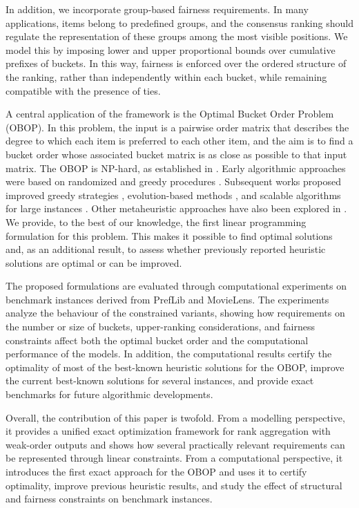 \documentclass[pdflatex,basic,Numbered]{jnl}%
\theoremstyle{plain}
\theoremstyle{remark}
\theoremstyle{thmstyleone}%
\theoremstyle{thmstylethree}%
\begin{document}
In addition, we incorporate group-based fairness requirements. In many applications, items belong to predefined groups, and the consensus ranking should regulate the representation of these groups among the most visible positions. We model this by imposing lower and upper proportional bounds over cumulative prefixes of buckets. In this way, fairness is enforced over the ordered structure of the ranking, rather than independently within each bucket, while remaining compatible with the presence of ties.

A central application of the framework is the Optimal Bucket Order Problem (OBOP). In this problem, the input is a pairwise order matrix that describes the degree to which each item is preferred to each other item, and the aim is to find a bucket order whose associated bucket matrix is as close as possible to that input matrix. The OBOP is NP-hard, as established in \cite{gionis2006algorithms}. 
Early algorithmic approaches were based on randomized and greedy procedures 
\citep{ukkonen2009randomized,kenkre2011discovering}. Subsequent works proposed 
improved greedy strategies \citep{aledo2017utopia}, evolution-based methods 
\citep{aledo2018approaching}, and scalable algorithms for large instances 
\citep{aledo2021highly}. Other metaheuristic approaches have also been explored 
in \cite{lorena2021biased}. We provide, to the best of our knowledge, the first 
 linear programming formulation for this problem. This makes 
it possible to find optimal solutions and, as an additional result, to assess 
whether previously reported heuristic solutions are optimal or can be improved.


The proposed formulations are evaluated through computational experiments on benchmark instances derived from PrefLib and MovieLens. The experiments analyze the behaviour of the constrained variants, showing how requirements on the number or size of buckets, upper-ranking considerations, and fairness constraints affect both the optimal bucket order and the computational performance of the models. In addition, the computational results certify the optimality of most of the best-known heuristic solutions for the OBOP, improve the current best-known solutions for several instances, and provide exact benchmarks for future algorithmic developments.


Overall, the contribution of this paper is twofold. From a modelling perspective, it provides a unified exact optimization framework for rank aggregation with weak-order outputs and shows how several practically relevant requirements can be represented through linear constraints. From a computational perspective, it introduces the first exact approach for the OBOP and uses it to certify optimality, improve previous heuristic results, and study the effect of structural and fairness constraints on benchmark instances.
\end{document}

